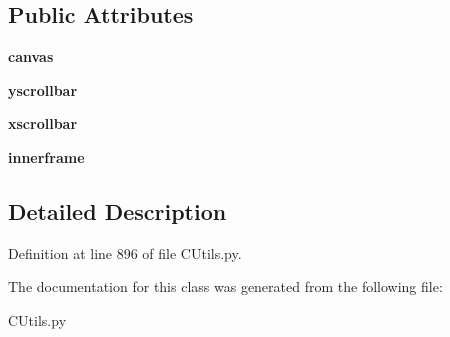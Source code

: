 \subsection*{Public Attributes}
\begin{DoxyCompactItemize}
\item 
\mbox{\label{class_c_utils_1_1_utils_1_1_u_i_1_1_controls_1_1_scrollable_container_afa9e9838abb44338f7cbe41dc6f846d4}} 
{\bfseries canvas}
\item 
\mbox{\label{class_c_utils_1_1_utils_1_1_u_i_1_1_controls_1_1_scrollable_container_a43a0eb61826d461f73acda3ad80dbb04}} 
{\bfseries yscrollbar}
\item 
\mbox{\label{class_c_utils_1_1_utils_1_1_u_i_1_1_controls_1_1_scrollable_container_a8ec2a9bb5b54d7e6266121686b2e9df1}} 
{\bfseries xscrollbar}
\item 
\mbox{\label{class_c_utils_1_1_utils_1_1_u_i_1_1_controls_1_1_scrollable_container_abeae1752984a7b01d65cdcde9c1a1126}} 
{\bfseries innerframe}
\end{DoxyCompactItemize}


\subsection{Detailed Description}


Definition at line 896 of file C\+Utils.\+py.



The documentation for this class was generated from the following file\+:\begin{DoxyCompactItemize}
\item 
C\+Utils.\+py\end{DoxyCompactItemize}
